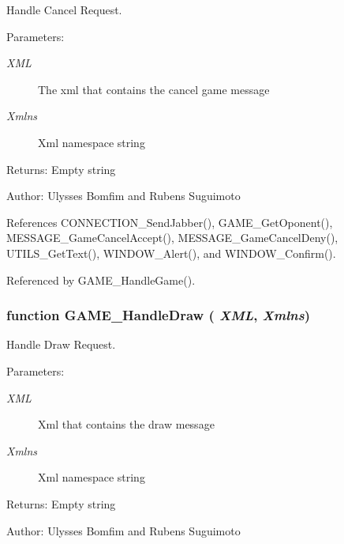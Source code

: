Handle Cancel Request. 

\begin{Desc}
\item[Parameters:]
\begin{description}
\item[{\em XML}]The xml that contains the cancel game message \item[{\em Xmlns}]Xml namespace string \end{description}
\end{Desc}
\begin{Desc}
\item[Returns:]Empty string \end{Desc}
\begin{Desc}
\item[Author:]Ulysses Bomfim and Rubens Suguimoto \end{Desc}


References CONNECTION\_\-SendJabber(), GAME\_\-GetOponent(), MESSAGE\_\-GameCancelAccept(), MESSAGE\_\-GameCancelDeny(), UTILS\_\-GetText(), WINDOW\_\-Alert(), and WINDOW\_\-Confirm().

Referenced by GAME\_\-HandleGame().
\subsubsection[GAME\_\-HandleDraw]{\setlength{\rightskip}{0pt plus 5cm}function GAME\_\-HandleDraw ( {\em XML}, \/   {\em Xmlns})}\label{game_2game_8js_9862068c1a46affdc4f753f33a750554}


Handle Draw Request. 

\begin{Desc}
\item[Parameters:]
\begin{description}
\item[{\em XML}]Xml that contains the draw message \item[{\em Xmlns}]Xml namespace string \end{description}
\end{Desc}
\begin{Desc}
\item[Returns:]Empty string \end{Desc}
\begin{Desc}
\item[Author:]Ulysses Bomfim and Rubens Suguimoto \end{Desc}


